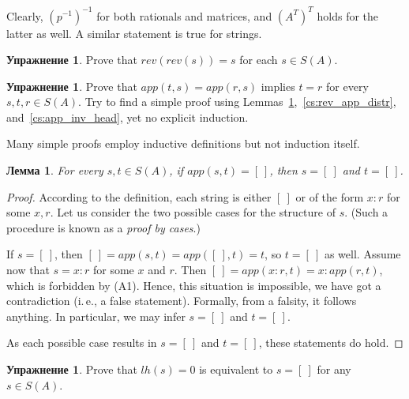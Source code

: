 \documentclass[12pt,notitlepage]{article}
\theoremstyle{plain}
\newtheorem{lemma}[thm]{Лемма}
\theoremstyle{definition}
\newtheorem{exc}[thm]{Упражнение}
\theoremstyle{plain}
\newcommand{\1}{\mathbf{1}}
\newcommand{\0}{\mathbf{0}}
\begin{document}
Clearly, $(p^{-1})^{-1}$ for both rationals and matrices, and $(A^T)^T$ holds for the latter as well. A similar statement is true for strings.
\begin{exc}\label{cs:rev_involutive}
	Prove that $rev(rev(s)) = s$ for each $s \in S(A)$.
\end{exc}

\begin{exc}
	Prove that $app(t,s) = app(r,s)$ implies $t = r$ for every $s, t, r \in S(A)$. Try to find a simple proof using Lemmas~\ref{cs:rev_involutive},~\ref{cs:rev_app_distr}, and~\ref{cs:app_inv_head}, yet no explicit induction.
\end{exc}

Many simple proofs employ inductive definitions but not induction itself.
\begin{lemma}\label{cs:app_eq_nil}
	For every $s,t \in S(A)$, if $app(s,t) = [\ ]$, then $s = [\ ]$ and $t = [\ ]$.
\end{lemma}
\begin{proof}
	According to the definition, each string is either $[\ ]$ or of the form $x : r$ for some $x, r$. Let us consider the two possible cases for the structure of $s$. (Such a procedure is known as a \emph{proof by cases}.)
	
	If $s = [\ ]$, then $[\ ] = app(s,t) = app([\ ], t) = t$, so $t = [\ ]$ as well. Assume now that $s = x : r$ for some $x$ and $r$. Then $[\ ] = app(x:r, t) = x : app(r, t)$, which is forbidden by (A1). Hence, this situation is impossible, we have got a contradiction (i.\,e., a false statement). Formally, from a falsity, it follows anything. In particular, we may infer $s = [\ ]$ and $t = [\ ]$.
	
	As each possible case results in $s = [\ ]$ and $t = [\ ]$, these statements do hold.
\end{proof}

\begin{exc}
	Prove that $lh(s) = 0$ is equivalent to  $s = [\ ]$ for any $s \in S(A)$.
\end{exc}
\end{document}
